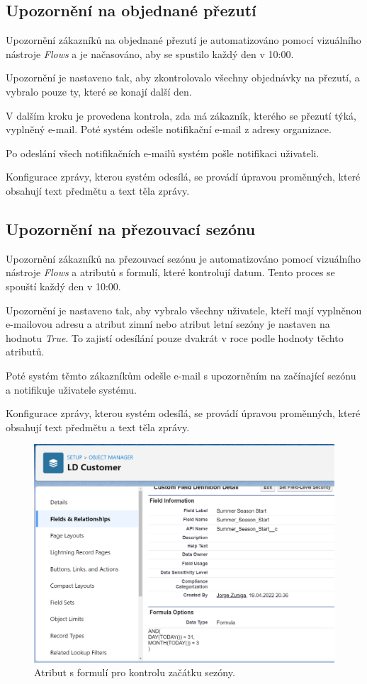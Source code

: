 \subsection{Upozornění na objednané přezutí} \label{subsec:automation_wheel_change_notification}
Upozornění zákazníků na objednané přezutí je automatizováno pomocí vizuálního nástroje \emph{Flows} a je načasováno, aby se spustilo každý den v 10:00.

Upozornění je nastaveno tak, aby zkontrolovalo všechny objednávky na přezutí, a vybralo pouze ty, které se konají další den. 

V dalším kroku je provedena kontrola, zda má zákazník, kterého se přezutí týká, vyplněný e-mail. Poté systém odešle notifikační e-mail z adresy organizace. 

Po odeslání všech notifikačních e-mailů systém pošle notifikaci uživateli.

Konfigurace zprávy, kterou systém odesílá, se provádí úpravou proměnných, které obsahují text předmětu a text těla zprávy.
\subsection{Upozornění na přezouvací sezónu} \label{subsec:automation_seasons}
Upozornění zákazníků na přezouvací sezónu je automatizováno pomocí vizuálního nástroje \emph{Flows} a atributů s formulí, které kontrolují datum. Tento proces se spouští každý den v 10:00.

Upozornění je nastaveno tak, aby vybralo všechny uživatele, kteří mají vyplněnou e-mailovou adresu a atribut zimní nebo atribut letní sezóny je nastaven na hodnotu \emph{True}. To zajistí odesílání pouze dvakrát v roce podle hodnoty těchto atributů.

Poté systém těmto zákazníkům odešle e-mail s upozorněním na začínající sezónu a notifikuje uživatele systému.

Konfigurace zprávy, kterou systém odesílá, se provádí úpravou proměnných, které obsahují text předmětu a text těla zprávy.
\begin{figure}[h!]
    \centering
    \includegraphics[width=\textwidth]{assets/7_implementace/automatizace/Summer season start.png}
    \caption{Atribut s formulí pro kontrolu začátku sezóny.}
    \label{fig:summer_season_start}
\end{figure}
\FloatBarrier
